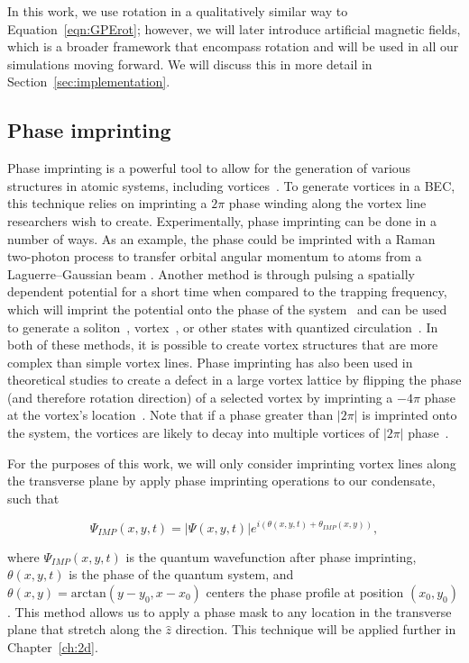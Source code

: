 In this work, we use rotation in a qualitatively similar way to Equation~\eqref{eqn:GPErot}; however, we will later introduce artificial magnetic fields, which is a broader framework that encompass rotation and will be used in all our simulations moving forward.
We will discuss this in more detail in Section~\ref{sec:implementation}.

\subsection{Phase imprinting}

Phase imprinting is a powerful tool to allow for the generation of various structures in atomic systems, including vortices~\cite{kumar2018, moulder2012, burger1999, denschlag2000}.
To generate vortices in a BEC, this technique relies on imprinting a $2\pi$ phase winding along the vortex line researchers wish to create.
Experimentally, phase imprinting can be done in a number of ways.
As an example, the phase could be imprinted with a Raman two-photon process to transfer orbital angular momentum to atoms from a Laguerre--Gaussian beam \cite{moulder2012, ryu2007}.
Another method is through pulsing a spatially dependent potential for a short time when compared to the trapping frequency, which will imprint the potential onto the phase of the system~\cite{kasevich1991} and can be used to generate a soliton~\cite{denschlag2000}, vortex~\cite{gajda1999}, or other states with quantized circulation~\cite{kumar2018}.
In both of these methods, it is possible to create vortex structures that are more complex than simple vortex lines.
Phase imprinting has also been used in theoretical studies to create a defect in a large vortex lattice by flipping the phase (and therefore rotation direction) of a selected vortex by imprinting a $-4\pi$ phase at the vortex's location~\cite{o2016topo}.
Note that if a phase greater than $|2\pi|$ is imprinted onto the system, the vortices are likely to decay into multiple vortices of $|2\pi|$ phase~\cite{shin2004}.

For the purposes of this work, we will only consider imprinting vortex lines along the transverse plane by apply phase imprinting operations to our condensate, such that

\begin{equation}
\Psi_{IMP}(x,y,t) = |\Psi(x,y,t)|e^{i(\theta(x,y,t) + \theta_{IMP}(x,y))},
\end{equation}

\noindent where $\Psi_{IMP}(x,y,t)$ is the quantum wavefunction after phase imprinting, $\theta(x,y,t)$ is the phase of the quantum system, and $\theta(x,y) = \text{arctan}(y-y_0, x-x_0)$ centers the phase profile at position $(x_0, y_0)$.
This method allows us to apply a phase mask to any location in the transverse plane that stretch along the $\hat z$ direction.
This technique will be applied further in Chapter~\ref{ch:2d}.

